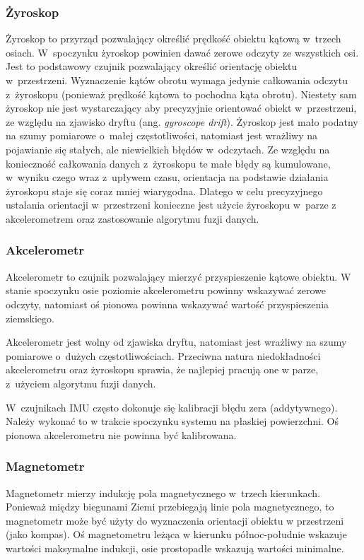\subsubsection{Żyroskop}
Żyroskop to przyrząd pozwalający określić prędkość obiektu kątową w~trzech
osiach.
W~spoczynku żyroskop powinien dawać zerowe odczyty ze wszystkich osi.
Jest to podstawowy czujnik pozwalający określić orientację obiektu
w~przestrzeni.
Wyznaczenie kątów obrotu wymaga jedynie całkowania odczytu z~żyroskopu
(ponieważ prędkość kątowa to pochodna kąta obrotu).
Niestety sam żyroskop nie jest wystarczający aby precyzyjnie orientować obiekt
w~przestrzeni, ze względu na zjawisko dryftu (ang. \textit{gyroscope drift}).
Żyroskop jest mało podatny na szumy pomiarowe o~małej częstotliwości, natomiast
jest wrażliwy na pojawianie się stałych, ale niewielkich błędów w~odczytach.
Ze względu na konieczność całkowania danych z~żyroskopu te małe błędy są
kumulowane, w~wyniku czego wraz z~upływem czasu, orientacja na podstawie
działania żyroskopu staje się coraz mniej wiarygodna.
Dlatego w celu precyzyjnego ustalania orientacji w~przestrzeni konieczne jest
użycie żyroskopu w~parze z akcelerometrem oraz zastosowanie algorytmu fuzji
danych.

\subsubsection{Akcelerometr}
Akcelerometr to czujnik pozwalający mierzyć przyspieszenie kątowe obiektu.
W stanie spoczynku osie poziomie akcelerometru powinny wskazywać zerowe
odczyty, natomiast oś pionowa powinna wskazywać wartość przyspieszenia
ziemskiego.

Akcelerometr jest wolny od zjawiska dryftu, natomiast jest wrażliwy na szumy
pomiarowe o~dużych częstotliwościach.
Przeciwna natura niedokładności akcelerometru oraz żyroskopu sprawia, że
najlepiej pracują one w parze, z~użyciem algorytmu fuzji danych.

W~czujnikach IMU często dokonuje się kalibracji błędu zera (addytywnego).
Należy wykonać to w trakcie spoczynku systemu na płaskiej powierzchni.
Oś pionowa akcelerometru nie powinna być kalibrowana.

\subsubsection{Magnetometr}
Magnetometr mierzy indukcję pola magnetycznego w~trzech kierunkach.
Ponieważ między biegunami Ziemi przebiegają linie pola magnetycznego, to
magnetometr może być użyty do wyznaczenia orientacji obiektu w przestrzeni
(jako kompas).
Oś magnetometru leżąca w kierunku północ-południe wskazuje wartości maksymalne
indukcji, osie prostopadłe wskazują wartości minimalne.


